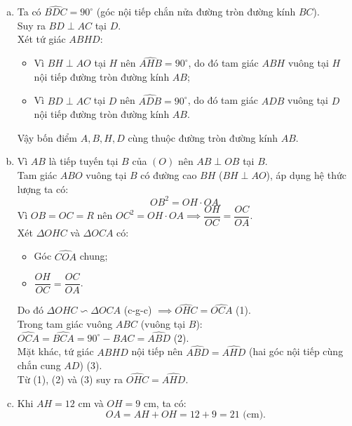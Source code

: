 \begin{bt}
{\begin{center}
\end{center}
\begin{enumerate}[a)]
	\item Ta có $\widehat{BDC} = 90^\circ$ (góc nội tiếp chắn nửa đường tròn đường kính $BC$).\\
	Suy ra $BD \perp AC$ tại $D$.\\
	Xét tứ giác $ABHD$:
	\begin{itemize}
		\item Vì $BH \perp AO$ tại $H$ nên $\widehat{AHB} = 90^\circ$, do đó tam giác $ABH$ vuông tại $H$ nội tiếp đường tròn đường kính $AB$;
		\item Vì $BD \perp AC$ tại $D$ nên $\widehat{ADB} = 90^\circ$, do đó tam giác $ADB$ vuông tại $D$ nội tiếp đường tròn đường kính $AB$.
	\end{itemize}
	Vậy bốn điểm $A, B, H, D$ cùng thuộc đường tròn đường kính $AB$.
	\item Vì $AB$ là tiếp tuyến tại $B$ của $(O)$ nên $AB \perp OB$ tại $B$.\\
	Tam giác $ABO$ vuông tại $B$ có đường cao $BH$ ($BH \perp AO$), áp dụng hệ thức lượng ta có:
	$$OB^2 = OH \cdot OA.$$
	Vì $OB = OC = R$ nên $OC^2 = OH \cdot OA \implies \dfrac{OH}{OC} = \dfrac{OC}{OA}$.\\
	Xét $\Delta OHC$ và $\Delta OCA$ có:
	\begin{itemize}
		\item Góc $\widehat{COA}$ chung;
		\item $\dfrac{OH}{OC} = \dfrac{OC}{OA}$.
	\end{itemize}
	Do đó $\Delta OHC \backsim \Delta OCA$ (c-g-c) $\implies \widehat{OHC} = \widehat{OCA}$ (1).\\
	Trong tam giác vuông $ABC$ (vuông tại $B$): $\widehat{OCA} = \widehat{BCA} = 90^\circ - \widehat{BAC} = \widehat{ABD}$ (2).\\
	Mặt khác, tứ giác $ABHD$ nội tiếp nên $\widehat{ABD} = \widehat{AHD}$ (hai góc nội tiếp cùng chắn cung $AD$) (3).\\
	Từ (1), (2) và (3) suy ra $\widehat{OHC} = \widehat{AHD}$.
	\item Khi $AH = 12\text{ cm}$ và $OH = 9\text{ cm}$, ta có:
	$$OA = AH + OH = 12 + 9 = 21\text{ (cm)}.$$

\end{enumerate}}
\end{bt}

